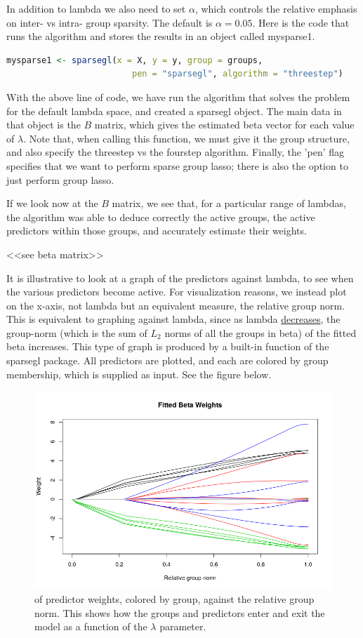\documentclass[titlepage]{article}
\begin{document}
In addition to lambda we also need to set $\alpha$, which controls the relative emphasis on inter- vs intra- group sparsity. The default is $\alpha = 0.05$. Here is the code that runs the algorithm and stores the results in an object called mysparse1.

\begin{lstlisting}[language=R]
mysparse1 <- sparsegl(x = X, y = y, group = groups,
                         pen = "sparsegl", algorithm = "threestep")
\end{lstlisting}
With the above line of code, we have run the algorithm that solves the problem for the default lambda space, and created a sparsegl object. The main data in that object is the $B$ matrix, which gives the estimated beta vector for each value of $\lambda$. Note that, when calling this function, we must give it the group structure, and also specify the threestep vs the fourstep algorithm. Finally, the 'pen' flag specifies that we want to perform sparse group lasso; there is also the option to just perform group lasso.

If we look now at the $B$ matrix, we see that, for a particular range of lambdas, the algorithm was able to deduce correctly the active groups, the active predictors within those groups, and accurately estimate their weights.

<<see beta matrix>>

It is illustrative to look at a graph of the predictors against lambda, to see when the various predictors become active. For visualization reasons, we instead plot on the x-axis, not lambda but an equivalent measure, the relative group norm. This is equivalent to graphing against lambda, since as lambda \underline{decreases}, the group-norm (which is the sum of $L_2$ norms of all the groups in beta) of the fitted beta increases. This type of graph is produced by a built-in function of the sparsegl package. All predictors are plotted, and each are colored by group membership, which is supplied as input. See the figure below.


\begin{figure}[tb!]
\centering
\includegraphics[scale=0.5]{fitted_beta_weights.png}
 of predictor weights, colored by group, against the relative group norm. This shows how the groups and predictors enter and exit the model as a function of the $\lambda$ parameter.
\label{fig:colorWeights}
\end{figure}
\end{document}
